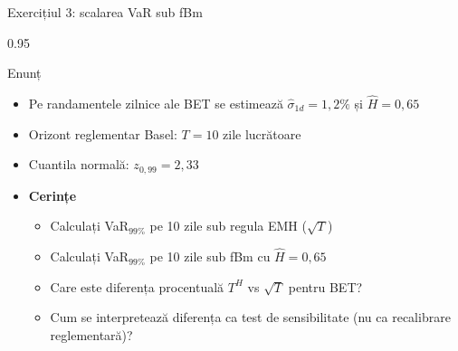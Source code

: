 \documentclass[9pt, aspectratio=169, t]{beamer}
\begin{document}
\begin{frame}[shrink=15]{Exercițiul 3: scalarea VaR sub fBm}
\begin{cminipage}{0.95\textwidth}
\begin{block}{Enunț}
\begin{itemize}\setlength{\itemsep}{0pt}
    \item Pe randamentele zilnice ale BET se estimează $\hat\sigma_{1d}=1{,}2\%$ și $\hat H=0{,}65$
    \item Orizont reglementar Basel: $T=10$ zile lucrătoare
    \item Cuantila normală: $z_{0{,}99}=2{,}33$
\end{itemize}
\end{block}
\begin{itemize}\setlength{\itemsep}{0pt}
    \item \textbf{Cerințe}
    \begin{itemize}\setlength{\itemsep}{0pt}
        \item Calculați VaR$_{99\%}$ pe 10 zile sub regula EMH ($\sqrt T$)
        \item Calculați VaR$_{99\%}$ pe 10 zile sub fBm cu $\hat H=0{,}65$
        \item Care este diferența procentuală $T^H$ vs $\sqrt T$ pentru BET?
        \item Cum se interpretează diferența ca test de sensibilitate (nu ca recalibrare reglementară)?
    \end{itemize}
\end{itemize}
\end{cminipage}
\end{frame}
\end{document}
